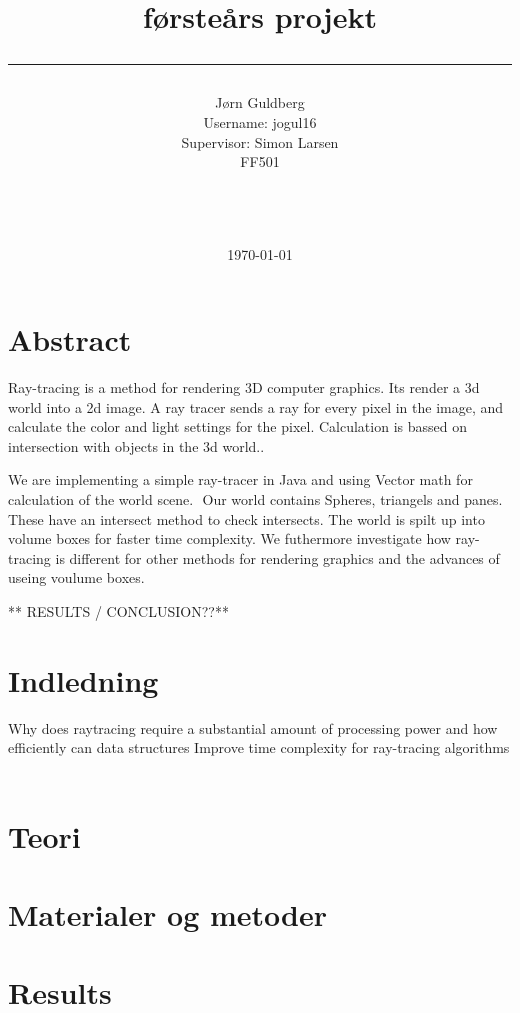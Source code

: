 \documentclass[a4paper,10pt]{article}
\title{førsteårs projekt\\\rule{10cm}{0.5mm}}
\author{Jørn Guldberg 
\\Username: jogul16
\\Supervisor: Simon Larsen\\ FF501\\\rule{5.5cm}{0.5mm}\\}
\date{\today}
\begin{document}
\maketitle



\newpage
\section{Abstract} 
Ray-tracing is a method for rendering 3D computer graphics.​ Its render a 3d world into a 2d image. 
A ray tracer sends a ray for every pixel in the image, and calculate the color and light settings for the pixel.
Calculation is bassed on intersection with objects in the 3d world.. 

We are implementing a simple ray-tracer in Java and using Vector math for calculation of the world scene. ​
Our world contains Spheres, triangels and panes. These have an intersect method to check intersects.
The world is spilt up into volume boxes for faster ​time complexity.
We futhermore investigate how ray-tracing is different for other methods for rendering graphics and
the advances of useing voulume boxes. 

** RESULTS / CONCLUSION??**
\newpage
\vfill
\tableofcontents

\newpage
\section{Indledning}
Why does raytracing require a substantial amount of processing power and how efficiently can data structures Improve time complexity for ray-tracing algorithms ​
\newpage

\section{Teori}

\newpage

\section{Materialer og metoder} 

\newpage

\section{Results} 
\end{document}
